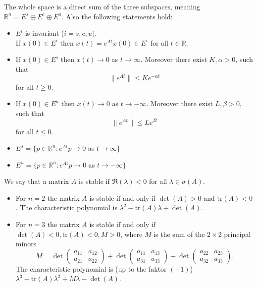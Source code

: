 \documentclass{article}
\newcommand*{\R}{\mathbb{R}}
\newcommand*{\tr}{\text{tr}}
\newcommand*{\mattwo}[4]{\begin{pmatrix}
    #1&#2\\#3&#4
\end{pmatrix}}
\begin{document}
\begin{thm}
    The whole space is a direct sum of the three subspaces, meaning $\R^n=E^s\oplus E^c \oplus E^u$. Also the following statements hold:
    \begin{itemize}
        \item $E^i$ is invariant ($i = s,c,u)$.\\
        If $x(0)\in E^i$ then $x(t)=e^{At}x(0)\in E^i$ for all $t \in \R$.

        \item If $x(0) \in E^s$ then $x(t) \to 0$ as $t\to \infty$. Moreover there exist $K,\alpha > 0$, such that
        $$\|e^{At}\| \leq  Ke^{-\alpha t}$$
        for all $ t \geq 0$.

        \item If $x(0)\in E^u$ then $x(t) \to 0$ as $t \to -\infty$. Moreover there exist $L,\beta > 0$, such that
        $$\|e^{At}\|\leq Le^{\beta t}$$
        for all $t\leq 0$.\\
        \item $E^s = \{ p \in \R^n:e^{At}p \to 0$ as $t \to \infty\}$
        \item $E^u = \{ p \in \R^n:e^{At}p \to 0$ as $t \to -\infty\}$
    \end{itemize}
\end{thm}

\begin{defin}
    We say that a matrix $A$ is stable if $\Re(\lambda) < 0$ for all $\lambda \in\sigma(A)$.
\end{defin}

\begin{itemize}
    \item For $n=2$ the matrix $A$ is stable if and only if $\det(A) > 0$ and $\tr(A) < 0$. The characteristic polynomial is $\lambda^2-\tr(A)\lambda+\det(A)$.

    \item For $n=3$ the matrix $A$ is stable if and only if $\det(A) < 0, \tr(A)< 0,M>0$, where $M$ is the sum of the $2\times2$ principal minors
    $$M =\det\mattwo{a_{11}}{a_{12}}{a_{21}}{a_{22}} + \det\mattwo{a_{11}}{a_{13}}{a_{31}}{a_{33}}+\det\mattwo{a_{22}}{a_{23}}{a_{32}}{a_{33}}.$$
    The characteristic polynomial is (up to the faktor $(-1)$) $\lambda^3 -\tr(A)\lambda^2+M\lambda-\det(A)$.
\end{itemize}
\end{document}
